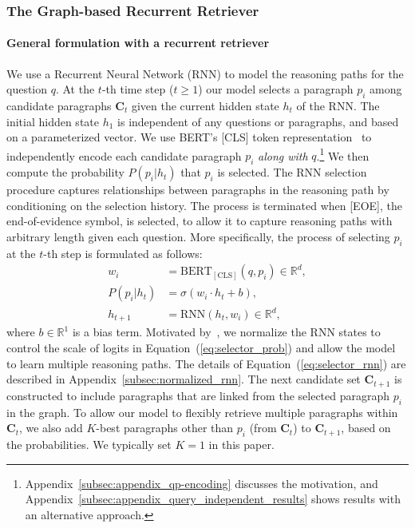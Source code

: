 \subsubsection{The Graph-based Recurrent Retriever}
\label{sec:selector}

\vspace{-2mm}\paragraph{General formulation with a recurrent retriever}
We use a Recurrent Neural Network (RNN) to model the reasoning paths for the question $q$.
At the $t$-th time step ($t\geq1$) our model selects a paragraph $p_{i}$ among candidate paragraphs $\mathbf{C}_t$ given the current hidden state $h_t$ of the RNN.
The initial hidden state $h_1$ is independent of any questions or paragraphs, and based on a parameterized vector.
We use BERT's [CLS] token representation~\citep{devlin2018bert} to independently encode each candidate paragraph $p_i$ {\it along with} $q$.\footnote{Appendix~\ref{subsec:appendix_qp-encoding} discusses the motivation, and Appendix~\ref{subsec:appendix_query_independent_results} shows results with an alternative approach.}
We then compute the probability $P(p_i|h_t)$ that $p_i$ is selected. 
The RNN selection procedure captures relationships between paragraphs in the reasoning path by conditioning on the selection history.
The process is terminated when [EOE], the end-of-evidence symbol, is selected, to allow it to capture reasoning paths with arbitrary length given each question.  
More specifically, the process of selecting $p_i$ at the $t$-th step is formulated as follows: \begin{align}
w_{i} &= \mathrm{BERT}_\mathrm{[CLS]}(q, p_i)\in\mathbb{R}^{d}, \label{eq:selector_qp_encoding} \\
P(p_i|h_t) &= \sigma(w_i \cdot h_t + b), \label{eq:selector_prob} \\
h_{t+1} &= \mathrm{RNN}(h_t, w_i)\in\mathbb{R}^{d},
\label{eq:selector_rnn}
\end{align}
where $b\in\mathbb{R}^{1}$ is a bias term.
Motivated by~\citet{NIPS2016_6114}, we normalize the RNN states to control the scale of logits in Equation~(\ref{eq:selector_prob}) and allow the model to learn multiple reasoning paths.
The details of Equation~(\ref{eq:selector_rnn}) are described in Appendix~\ref{subsec:normalized_rnn}.
The next candidate set $\mathbf{C}_{t+1}$ is constructed to include paragraphs that are linked from the selected paragraph $p_i$ in the graph.
To allow our model to flexibly retrieve multiple paragraphs within $\mathbf{C}_{t}$, we also add $K$-best paragraphs other than $p_i$ (from $\mathbf{C}_{t}$) to $\mathbf{C}_{t+1}$, based on the probabilities.
We typically set $K=1$ in this paper.

